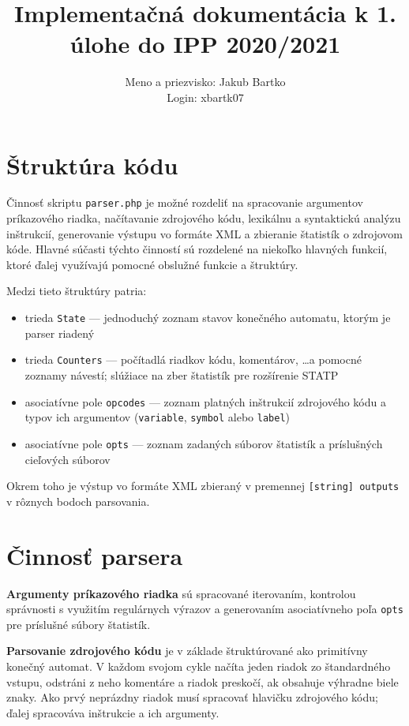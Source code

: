 \documentclass[a4paper, 10pt]{article}
\title{Implementačná dokumentácia k 1. úlohe do IPP 2020/2021}
\author{Meno a priezvisko: Jakub Bartko \\ Login: xbartk07}
\date{}
\begin{document}
\maketitle

\section{Štruktúra kódu}
Činnosť skriptu \texttt{parser.php} je možné rozdeliť na spracovanie argumentov príkazového riadka, načítavanie zdrojového kódu, lexikálnu a syntaktickú analýzu inštrukcií, generovanie výstupu vo formáte XML a zbieranie štatistík o zdrojovom kóde. Hlavné súčasti týchto činností sú rozdelené na niekoľko hlavných funkcií, ktoré ďalej využívajú pomocné obslužné funkcie a štruktúry.

Medzi tieto štruktúry patria:
\begin{itemize}
\item trieda \texttt{State} --- jednoduchý zoznam stavov konečného automatu, ktorým je parser riadený
\item trieda \texttt{Counters} --- počítadlá riadkov kódu, komentárov, \dots a pomocné zoznamy návestí; slúžiace na zber štatistík pre rozšírenie \textsc{STATP}
\item asociatívne pole \texttt{opcodes} --- zoznam platných inštrukcií zdrojového kódu a typov ich argumentov (\texttt{variable}, \texttt{symbol} alebo \texttt{label})
\item asociatívne pole \texttt{opts} --- zoznam zadaných súborov štatistík a príslušných cieľových súborov
\end{itemize}
Okrem toho je výstup vo formáte XML zbieraný v premennej \texttt{[string] outputs} v rôznych bodoch parsovania.

\section{Činnosť parsera}
\textbf{Argumenty príkazového riadka} sú spracované iterovaním, kontrolou správnosti s využitím regulárnych výrazov a generovaním asociatívneho poľa \texttt{opts} pre príslušné súbory štatistík.

\textbf{Parsovanie zdrojového kódu} je v základe štruktúrované ako primitívny konečný automat. V každom svojom cykle načíta jeden riadok zo štandardného vstupu, odstráni z neho komentáre a riadok preskočí, ak obsahuje výhradne biele znaky. Ako prvý neprázdny riadok musí spracovať hlavičku zdrojového kódu; ďalej spracováva inštrukcie a ich argumenty.
\end{document}
